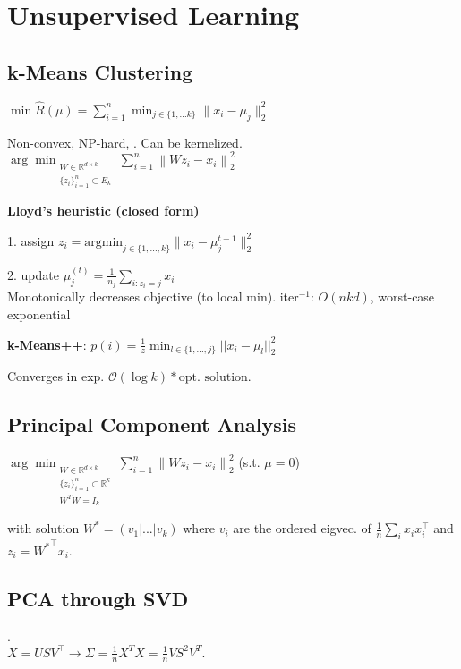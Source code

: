 \section*{Unsupervised Learning}

\subsection*{k-Means Clustering}

$\min \hat{R}(\mu) = \sum_{i=1}^n \min_{j\in\{1,...k\}}\|x_i-\mu_j\|_2^2$

Non-convex, NP-hard, . Can be kernelized. \\[-10pt]

$\arg \min_{\substack{W \in \mathbb{R}^{d \times k} \\ \{ z_i \}_{i=1}^{n} \subset E_k}} \sum_{i=1}^{n} \left\| W z_i - x_i \right\|_2^2$




\textbf{Lloyd's heuristic \quad \normalfont \color{black}(closed form)} 

1. assign $z_i = \text{argmin}_{j\in\{1,...,k\}}\|x_i - \mu_j^{t-1}\|_2^2$

2. update $\mu_j^{(t)} = \frac{1}{n_j}\sum_{i:z_i=j}x_i$\\
Monotonically decreases objective (to local min). iter$^{-1}$: $O(nkd)$, worst-case exponential

\textbf{k-Means++}: $p(i) = \frac{1}{z} \min_{l \in \{1,...,j\}} ||x_i - \mu_l||_2^2$

Converges in exp. $\mathcal O (\log k) * \text{opt. solution}$.

\subsection*{Principal Component Analysis}
 
$\arg \min_{\substack{W \in \mathbb{R}^{d \times k} \\ \{ z_i \}_{i=1}^{n} \subset \mathbb{R}^k \\ W^T W = I_k}} \sum_{i=1}^{n} \left\| W z_i - x_i \right\|_2^2
$ (s.t. $\mu = 0$)

with solution $W^* = (v_1|...|v_k)$ where $v_i$ are the ordered 
eigvec. of $\frac{1}{n}\sum_ix_ix_i^\top$ 
and $z_i = {W^*}^\top x_i$. 

\subsection*{PCA through SVD}
\color{White} . \color {Black}\\[-10pt]
$X = U S V^\top \rightarrow \Sigma = \frac{1}{n} X^T X = \frac{1}{n} VS^2 V^T.$

